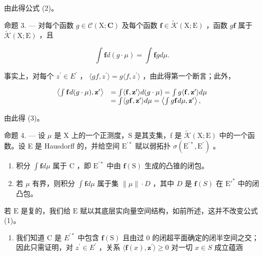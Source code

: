 由此得公式 (2)。

命题 3. --- 对每个函数 \(g \in \mathcal{C}(\mathrm{X};\mathbf{C})\) 及每个函数 \(\mathbf{f} \in \widetilde{\mathcal{K}}(\mathrm{X};\mathrm{E})\) ，函数 \(g\mathbf{f}\) 属于 \(\widetilde{\mathcal{K}}(\mathrm{X};\mathrm{E})\) ，且

\[
\int \mathbf {f} d (g \cdot \mu) = \int \mathbf {f} g d \mu .\tag{3}
\]

事实上，对每个 \(z^{\prime} \in E^{\prime}\) ， \(\langle gf, z^{\prime} \rangle = g\langle f, z^{\prime} \rangle\) ，由此得第一个断言；此外，

\[
\begin{array}{r l} \left\langle \int \mathbf {f} d (g \cdot \mu), \mathbf {z} ^ {\prime} \right\rangle & = \int \langle \mathbf {f}, \mathbf {z} ^ {\prime} \rangle d (g \cdot \mu) = \int g \langle \mathbf {f}, \mathbf {z} ^ {\prime} \rangle d \mu \\ & = \int \langle g \mathbf {f}, \mathbf {z} ^ {\prime} \rangle d \mu = \left\langle \int g \mathbf {f} d \mu , \mathbf {z} ^ {\prime} \right\rangle , \end{array}
\]

由此得 (3)。

命题 4. --- 设 \(\mu\) 是 X 上的一个正测度，S 是其支集，f 是 \(\widetilde{\mathcal{K}}(\mathrm{X};\mathrm{E})\) 中的一个函数。设 E 是 Hausdorff 的，并给空间 \(\mathrm{E}^{\prime*}\) 赋以弱拓扑 \(\sigma(\mathrm{E}^{\prime*},\mathrm{E}^{\prime})\) 。

\begin{enumerate}
\def\labelenumi{(\roman{enumi})}
\item
  积分 \(\int \mathbf{f}d\mu\) 属于 C ，即 \(\mathrm{E}^{\prime *}\) 中由 \(\mathbf{f}(\mathrm{S})\) 生成的凸锥的闭包。
\item
  若 \(\mu\) 有界，则积分 \(\int \mathbf{f} d\mu\) 属于集 \(\| \mu \| \cdot D\) ，其中 \(D\) 是 \(\mathbf{f}(S)\) 在 \(\mathrm{E}'^*\) 中的闭凸包。
\end{enumerate}

若 \(\mathrm{E}\) 是复的，我们给 \(\mathrm{E}\) 赋以其底层实向量空间结构，如前所述，这并不改变公式 (1)。

\begin{enumerate}
\def\labelenumi{(\roman{enumi})}
\tightlist
\item
  我们知道 C 是 \(E^{\prime*}\) 中包含 \(\mathbf{f}(\mathrm{S})\) 且由过 0 的闭超平面确定的闭半空间之交；因此只需证明，对 \(z^{\prime} \in E^{\prime}\) ，关系 \(\langle\mathbf{f}(x), \mathbf{z}^{\prime}\rangle \geqslant 0\) 对一切 \(x \in S\) 成立蕴涵
\end{enumerate}

